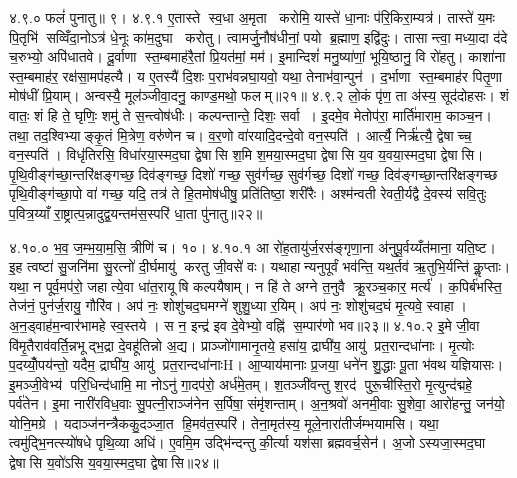 ४.९.०
फलं॑ पुनातु॥ ९।
४.९.१
ए॒तास्ते स्व॒धा अ॒मृता करोमि॒ यास्ते॑ धा॒नाः प॑रि॒किरा॒म्यत्र॑। तास्ते॑ य॒मः पि॒तृभि॑ सव्विँदा॒नोऽत्र॑ धे॒नूः का॑म॒दुघा करोतु। त्वामर्जु॒नौष॑धीनां॒ पयो ब्र॒ह्माण॒ इद्वि॑दुः। तासान्त्वा॒ मध्या॒दा द॑दे च॒रुभ्यो॒ अपि॑धातवे। दू॒र्वाणा स्त॒म्बमाह॑रै॒तां प्रि॒यत॑मां॒ मम॑। इ॒मान्दिशं॑ मनु॒ष्या॑णां॒ भूयि॒ष्ठानु॒ वि रो॑हतु। काशा॑ना स्त॒म्बमाह॑र॒ रक्ष॑सा॒मप॑हत्यै। य ए॒तस्यै॑ दि॒शः प॒राभ॑वन्नघा॒यवो॒ यथा॒ तेनाभ॑वा॒न्पुन॑। द॒र्भाणा स्त॒म्बमाह॑र पितृ॒णा मोष॑धीं प्रि॒याम्। अन्वस्यै॒ मूल॑ञ्जीवा॒दनु॒ काण्ड॒मथो॒ फलम्॥२१॥
४.९.२
लो॒कं पृ॑ण॒ ता अ॑स्य॒ सूद॑दोहसः। शं वातः॒ शं हि ते॒ घृणिः॒ शमु॑ ते स॒न्त्वोष॑धीः। कल्पन्तान्ते॒ दिशः॒ सर्वा। इ॒दमे॒व मेतोप॑रा॒ मार्ति॑माराम॒ काञ्च॒न। तथा॒ तद॒श्विभ्याङ्कृ॒तं मि॒त्रेण॒ वरु॑णेन च। व॒र॒णो वा॑रयादि॒दन्दे॒वो वन॒स्पति॑। आर्त्यै॒ निर्\mbox{}ऋ॑त्यै॒ द्वेषाच्च॒ वन॒स्पति॑। विधृ॑तिरसि॒ विधा॑रया॒स्मद॒घा द्वेषासि श॒मि श॒मया॒स्मद॒घा द्वेषासि य॒व य॒वया॒स्मद॒घा द्वेषासि। पृ॒थि॒वीङ्ग॑च्छा॒न्तरि॑क्षङ्गच्छ॒ दिव॑ङ्गच्छ॒ दिशो॑ गच्छ॒ सुव॑र्गच्छ॒ सुव॑र्गच्छ॒ दिशो॑ गच्छ॒ दिव॑ङ्गच्छा॒न्तरि॑क्षङ्गच्छ पृथि॒वीङ्ग॑च्छा॒पो वा॑ गच्छ॒ यदि॒ तत्र॑ ते हि॒तमोष॑धीषु॒ प्रति॑तिष्ठा॒ शरी॑रैः। अश्म॑न्वती रेवती॒र्यद्वै दे॒वस्य॑ सवि॒तुः प॒वित्र॒य्याँ रा॒ष्ट्रात्प॒न्नादुद्व॒यन्तम॑स॒स्परि॑ धा॒ता पु॑नातु॥२२॥
\anuvakamend

४.१०.०
भ॒व॒ ज॒म्भ॒या॒म॒सि॒ त्रीणि॑ च। १०।
४.१०.१
आ रो॑ह॒तायु॑र्ज॒रस॑ङ्गृणा॒ना अ॑नुपू॒र्वय्यँत॑माना॒ यति॒ष्ट। इ॒ह त्वष्टा॑ सु॒जनि॑मा सु॒रत्नो॑ दी॒र्घमायु॑ करतु जी॒वसे॑ वः। यथाहान्यनुपूर्वं भव॑न्ति॒ यथ॒र्तव॑ ऋ॒तुभि॒र्यन्ति॑ कॢ॒प्ताः। यथा॒ न पूर्व॒मप॑रो॒ जहात्ये॒वा धा॑त॒रायूषि कल्पयैषाम्। न हि॑ ते अग्ने त॒नुवै क्रू॒रञ्च॒कार॒ मर्त्य॑। क॒पिर्ब॑भस्ति॒ तेज॑नं॒ पुन॑र्ज॒रायु॒ गौरि॑व। अप॑ नः॒ शोशु॑चद॒घमग्ने॑ शुशु॒ध्या र॒यिम्। अप॑ नः॒ शोशु॑चद॒घं मृ॒त्यवे॒ स्वाहा। अ॒न॒ड्वाह॑म॒न्वार॑भामहे स्व॒स्तये। स न॒ इन्द्र॑ इव दे॒वेभ्यो॒ वह्नि॑ स॒म्पार॑णो भव॥२३॥
४.१०.२
इ॒मे जी॒वा वि॑मृ॒तैराव॑वर्ति॒न्नभूद्भ॒द्रा दे॒वहू॑तिन्नो अ॒द्य। प्राञ्जो॑गामानृ॒तये॒ हसा॑य॒ द्राघी॑य॒ आयु॑ प्रत॒रान्दधा॑नाः। मृ॒त्योः प॒दय्योँ॒पय॑न्तो॒ यदैम॒ द्राघी॑य॒ आयु॑ प्रत॒रान्दधा॑नाःH। आ॒प्याय॑मानाः प्र॒जया॒ धने॑न शु॒द्धाः पू॒ता भ॑वथ यज्ञियासः। इ॒मञ्जी॒वेभ्य॑ परि॒धिन्द॑धामि॒ मा नोऽनु॑ गा॒दप॑रो॒ अर्ध॑मे॒तम्। श॒तञ्जी॑वन्तु श॒रद॑ पुरू॒चीस्ति॒रो मृ॒त्युन्द॑द्महे॒ पर्व॑तेन। इ॒मा नारी॑रविध॒वाः सु॒पत्नी॒राञ्ज॑नेन स॒र्पिषा॒ संमृ॑शन्ताम्। अ॒न॒श्रवो॑ अनमी॒वाः सु॒शेवा॒ आरो॑हन्तु॒ जन॑यो॒ योनि॒मग्रे। यदाञ्ज॑नन्त्रैककु॒दञ्जा॒त हि॒मव॑त॒स्परि॑। तेना॒मृत॑स्य॒ मूले॒नारा॑तीर्जम्भयामसि। यथा॒ त्वमु॑द्भि॒नत्स्यो॑षधे पृथि॒व्या अधि॑। ए॒वमि॒म उद्भि॑न्दन्तु की॒र्त्या यश॑सा ब्रह्मवर्च॒सेन॑। अ॒जोऽस्यजा॒स्मद॒घा द्वेषासि य॒वो॑ऽसि य॒वया॒स्मद॒घा द्वेषासि॥२४॥
\anuvakamend

